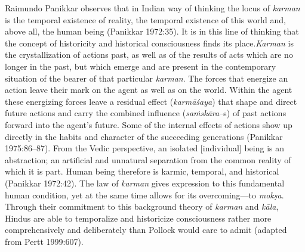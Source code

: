 Raimundo Panikkar observes that in Indian way of thinking the locus of \textit{karman} is the temporal existence of reality, the temporal existence of this world and, above all, the human being (Panikkar 1972:35). It is in this line of thinking that the concept of historicity and historical consciousness finds its place.\textit{Karman} is the crystallization of actions past, as well as of the results of acts which are no longer in the past, but which emerge and are present in the contemporary situation of the bearer of that particular \textit{karman}. The forces that energize an action leave their mark on the agent as well as on the world. Within the agent these energizing forces leave a residual effect (\textit{karmāśaya}) that shape and direct future actions and carry the combined influence (\textit{saṁskāra–}s) of past actions forward into the agent's future. Some of the internal effects of actions show up directly in the habits and character of the succeeding generations (Panikkar 1975:86–87). From the Vedic perspective, an isolated [individual] being is an abstraction; an artificial and unnatural separation from the common reality of which it is part. Human being therefore is karmic, temporal, and historical (Panikkar 1972:42). The law of \textit{karman} gives expression to this fundamental human condition, yet at the same time allows for its overcoming—to \textit{mokṣa}. Through their commitment to this background theory of \textit{karman} and \textit{kāla}, Hindus are able to temporalize and historicize consciousness rather more comprehensively and deliberately than Pollock would care to admit (adapted from Pertt 1999:607).

